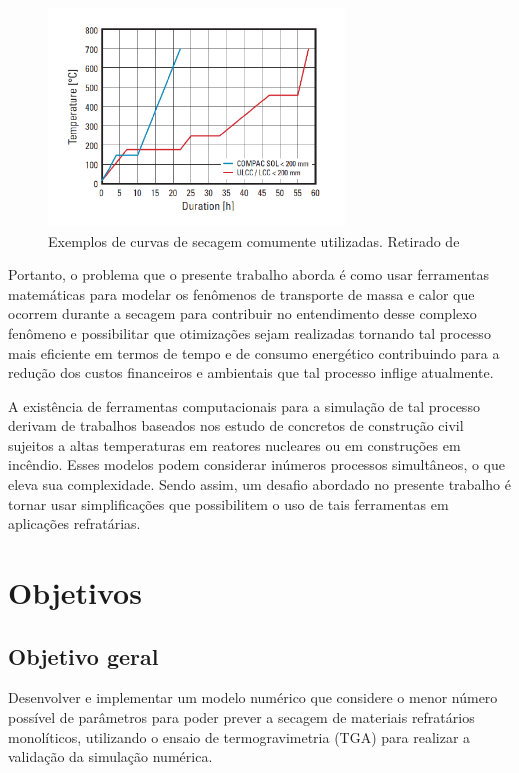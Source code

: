     \begin{figure}[ht]
        \centering
        \includegraphics[width=0.7\textwidth]{figures/hucs.pdf}
        \caption{Exemplos de curvas de secagem comumente utilizadas. Retirado de \cite{rhi}}
        \label{fig:hucs}
   \end{figure}

   Portanto, o problema que o presente trabalho aborda é como usar ferramentas
   matemáticas para modelar os fenômenos de transporte de massa e calor que
   ocorrem durante a secagem para contribuir no entendimento desse complexo
   fenômeno e possibilitar que otimizações sejam realizadas tornando tal processo mais eficiente em termos de tempo e de consumo energético contribuindo para a redução dos custos financeiros e ambientais que tal processo inflige atualmente.
 
 A existência de ferramentas computacionais para a simulação de tal processo derivam de trabalhos baseados nos estudo de concretos de construção civil sujeitos a altas temperaturas em reatores nucleares ou em construções em incêndio.  Esses modelos podem considerar inúmeros processos simultâneos, o que eleva sua complexidade. Sendo assim, um desafio abordado no presente trabalho é tornar usar simplificações que possibilitem o uso de tais ferramentas em aplicações refratárias.
   
\section{Objetivos}
    \subsection{Objetivo geral}
        
    Desenvolver e implementar um modelo numérico que considere o menor número possível de parâmetros para poder prever a secagem de materiais refratários monolíticos, utilizando o ensaio de termogravimetria (TGA) para realizar a validação da simulação numérica.
        
